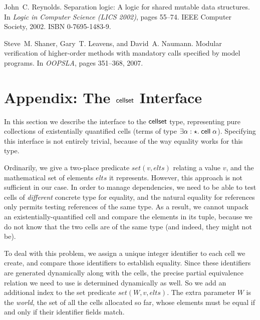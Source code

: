 \documentclass[natbib]{sigplanconf}
\begin{document}
\begin{thebibliography}{26}
John~C. Reynolds.
\newblock Separation logic: A logic for shared mutable data structures.
\newblock In \emph{Logic in Computer Science (LICS 2002)}, pages 55--74. IEEE
  Computer Society, 2002.
\newblock ISBN 0-7695-1483-9.

Steve~M. Shaner, Gary~T. Leavens, and David~A. Naumann.
\newblock Modular verification of higher-order methods with mandatory calls
  specified by model programs.
\newblock In \emph{OOPSLA}, pages 351--368, 2007.

\end{thebibliography}


% 
% 
% 
% 

\appendix

\section{Appendix: The $\mbox{\textsf{{cellset}}}$ Interface}

In this section we describe the interface to the $\mbox{\textsf{{cellset}}}$ type,
representing pure collections of existentially quantified cells
(terms of type $\exists \alpha:\star.\;
\mbox{\textsf{{cell}}}\;{\alpha}$). Specifying this interface is not entirely
trivial, because of the way equality works for this type. 

Ordinarily, we give a two-place predicate $set(v, elts)$ relating a
value $v$, and the mathematical set of elements $elts$ it represents.
However, this approach is not sufficient in our case. In order to
manage dependencies, we need to be able to test cells of
\emph{different} concrete type for equality, and the natural equality
for references only permits testing references of the same type. As a
result, we cannot unpack an existentially-quantified cell and compare
the elements in its tuple, because we do not know that the two cells
are of the same type (and indeed, they might not be). 

To deal with this problem, we assign a unique integer identifier to
each cell we create, and compare those identifiers to establish
equality. Since these identifiers are generated dynamically along with
the cells, the precise partial equivalence relation we need to use is
determined dynamically as well. So we add an additional index to the
set predicate $set(W, v, elts)$. The extra parameter $W$ is the
\emph{world}, the set of all the cells allocated so far, whose
elements must be equal if and only if their identifier fields match.
\end{document}
